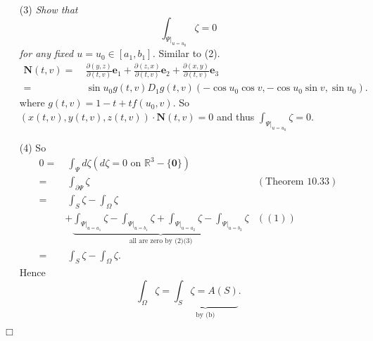 \documentclass{article}
\begin{document}
\begin{enumerate}
\item[(3)]
  \emph{Show that
  \[
    \int_{\Psi|_{u=u_0}} \zeta = 0
  \]
  for any fixed $u = u_0 \in [a_1, b_1]$.}
  Similar to (2).
  \begin{align*}
    \mathbf{N}(t,v)
    =& \: \frac{\partial(y,z)}{\partial(t,v)} \mathbf{e}_1
      + \frac{\partial(z,x)}{\partial(t,v)} \mathbf{e}_2
      + \frac{\partial(x,y)}{\partial(t,v)}\mathbf{e}_3 \\
    =& \: \sin u_0 g(t,v) D_1 g(t,v)(-\cos u_0 \cos v, -\cos u_0 \sin v, \sin u_0).
  \end{align*}
  where $g(t,v) = 1-t+tf(u_0,v)$.
  So $(x(t,v),y(t,v),z(t,v)) \cdot \mathbf{N}(t,v) = 0$ and thus
  $\int_{\Psi|_{u=u_0}} \zeta = 0$.

\item[(4)]
  So
  \begin{align*}
    0
    =& \: \int_{\Psi} d\zeta (\text{$d\zeta = 0$ on $\mathbb{R}^3-\{\mathbf{0}\}$}) \\
    =& \: \int_{\partial \Psi} \zeta
      &(\text{Theorem 10.33}) \\
    =& \: \int_{S} \zeta - \int_{\Omega} \zeta \\
      &+ \underbrace{\int_{\Psi|_{u=a_1}} \zeta - \int_{\Psi|_{u=b_1}} \zeta
      + \int_{\Psi|_{u=a_2}} \zeta - \int_{\Psi|_{u=b_2}} \zeta}_{\text{all are zero by (2)(3)}}
        &((1)) \\
    =& \: \int_{S} \zeta - \int_{\Omega} \zeta.
  \end{align*}
  Hence
  \[
    \int_{\Omega} \zeta = \underbrace{\int_{S} \zeta = A(S)}_{\text{by (b)}}.
  \]
\end{enumerate}
$\Box$ \\
\end{document}
